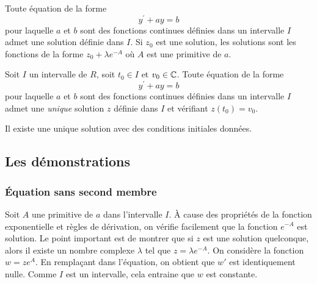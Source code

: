 \begin{prop}
 Toute équation de la forme
\begin{equation*}
 y^\prime +  a y = b
\end{equation*}
pour laquelle $a$ et $b$ sont des fonctions continues définies dans un intervalle $I$ admet une solution définie dans $I$. Si $z_0$ est une solution, les solutions sont les fonctions de la forme $z_0+\lambda e^{-A}$ où $A$ est une primitive de $a$.
\end{prop}

\begin{prop}
Soit $I$ un intervalle de $R$, soit $t_0\in I$ et $v_0\in \mathbb{C}$. Toute équation de la forme
\begin{equation*}
 y^\prime +  a y = b
\end{equation*}
pour laquelle $a$ et $b$ sont des fonctions continues définies dans un intervalle $I$ admet une \emph{unique} solution $z$ définie dans $I$ et vérifiant $z(t_0)=v_0$.
\end{prop}
\begin{rem}
 Il existe une unique solution avec des conditions initiales données.
\end{rem}

\subsection{Les démonstrations}
\subsubsection{\'Equation sans second membre}
\begin{demo}
 Soit $A$ une primitive de $a$ dans l'intervalle $I$. \`A cause des propriétés de la fonction exponentielle et règles de dérivation, on vérifie facilement que la fonction $e^{-A}$ est solution.\newline
Le point important est de montrer que si $z$ est une solution quelconque, alors il existe un nombre complexe $\lambda$ tel que $z=\lambda e^{-A}$. On considère la fonction $w = z e^{A}$. En remplaçant dans l'équation, on obtient que $w'$ est identiquement nulle. Comme $I$ est un intervalle, cela entraine que $w$ est constante.
\end{demo}

